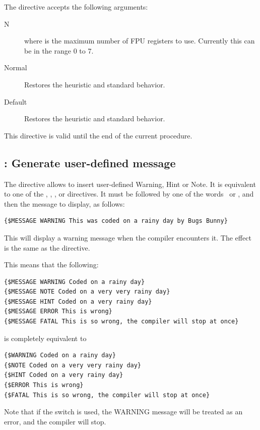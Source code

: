 The directive accepts the following arguments:

\begin{description}
\item [N] where  is the maximum number of FPU registers to use.
Currently this can be in the range 0 to 7.
\item[Normal] Restores the heuristic and standard behavior.
\item[Default] Restores the heuristic and standard behavior.
\end{description}

\begin{remark}This directive is valid until the end of the current procedure.
\end{remark}

\subsection{ : Generate user-defined message}
The  directive allows to insert user-defined Warning, Hint or Note. 
It is equivalent to one of the , , ,  or  
directives. It must be followed by one of the words  \,  or
, and then the message to display, as follows:

\begin{verbatim}
{$MESSAGE WARNING This was coded on a rainy day by Bugs Bunny}
\end{verbatim}
This will display a warning message when the compiler encounters it. 
The effect is the same as the  directive.

This means that the following:
\begin{verbatim}
{$MESSAGE WARNING Coded on a rainy day}
{$MESSAGE NOTE Coded on a very very rainy day}
{$MESSAGE HINT Coded on a very rainy day}
{$MESSAGE ERROR This is wrong}
{$MESSAGE FATAL This is so wrong, the compiler will stop at once}
\end{verbatim}
is completely equivalent to
\begin{verbatim}
{$WARNING Coded on a rainy day}
{$NOTE Coded on a very very rainy day}
{$HINT Coded on a very rainy day}
{$ERROR This is wrong}
{$FATAL This is so wrong, the compiler will stop at once}
\end{verbatim}

Note that if the  switch is used, the WARNING message will be
treated as an error, and the compiler will stop.

